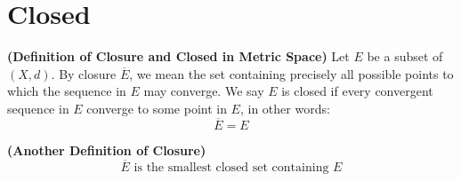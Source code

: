 \documentclass{report}
\begin{document}
\section{Closed}
\begin{definition}
\label{1.2.1}
\textbf{(Definition of Closure and Closed in Metric Space)} Let $E$ be a subset of  $(X,d)$. By closure $\overline{E}$, we mean the set containing precisely all possible points to which the sequence in $E$ may converge. We say $E$ is closed if every convergent sequence in $E$ converge to some point in $E$, in other words:
 \begin{equation}
\overline{E}=E
\end{equation}
\end{definition}
\begin{theorem}
\label{1.2.2}
\textbf{(Another Definition of Closure)}
\begin{equation}
\overline{E}\text{ is the smallest closed set containing }E
\end{equation}
\end{theorem}
\end{document}
